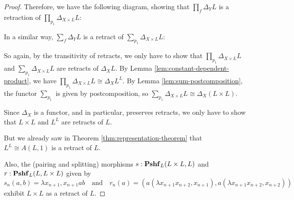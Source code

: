 \begin{proof}
  Therefore, we have the following diagram, showing that $ \prod_f \Delta_Y L $ is a retraction of $ \prod_{p_1} \Delta_{X \times L} L $:
  \begin{center}
  \end{center}
  In a similar way, $ \sum_f \Delta_Y L $ is a retract of $ \sum_{p_1} \Delta_{X \times L} L $:
  \begin{center}
  \end{center}
  So again, by the transitivity of retracts, we only have to show that $ \prod_{p_1} \Delta_{X \times L} L $ and $ \sum_{p_1} \Delta_{X \times L} L $ are retracts of $ \Delta_X L $. By Lemma \ref{lem:constant-dependent-product}, we have $ \prod_{p_1} \Delta_{X \times L} L \cong \Delta_X L^L $. By Lemma \ref{lem:sum-postcomposition}, the functor $ \sum_{p_1} $ is given by postcomposition, so $ \sum_{p_1} \Delta_{X \times L} L \cong \Delta_X (L \times L) $.

  Since $ \Delta_X $ is a functor, and in particular, preserves retracts, we only have to show that $ L \times L $ and $ L^L $ are retracts of $ L $.

  But we already saw in Theorem \ref{thm:representation-theorem} that $ L^L \cong A(L, 1) $ is a retract of $ L $.

  Also, the (pairing and splitting) morphisms $ s: \mathbf{Pshf}_{L}(L \times L, L) $ and $ r: \mathbf{Pshf}_{L}(L, L \times L) $ given by
  \[ s_n(a, b) = \lambda x_{n + 1}, x_{n + 1} a b \quad \text{and} \quad r_n(a) = (a (\lambda x_{n + 1} x_{n + 2}, x_{n + 1}), a (\lambda x_{n + 1} x_{n + 2}, x_{n + 2})) \]
  exhibit $ L \times L $ as a retract of $ L $.
\end{proof}

